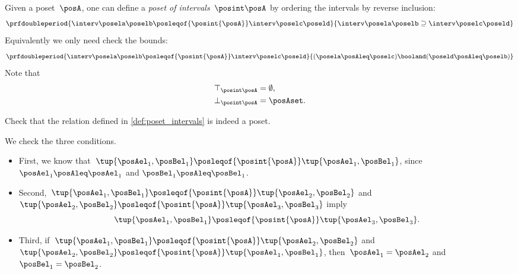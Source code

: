 \begin{definition}
    \label{def:poset_intervals}
    Given a poset~$\posA$, one can define a \emph{poset of intervals}~$\posint\posA$
    by ordering the intervals by reverse inclusion:
    \begin{equation}
        \prfdoubleperiod{
            \interv \posela \poselb
            \posleqof{\posint{\posA}}
            \interv \poselc \poseld
        }{
            \interv \posela \poselb
            \supseteq
            \interv \poselc \poseld
        }
    \end{equation}
    Equivalently we only need check the bounds:
    \begin{equation}
        \prfdoubleperiod{
            \interv \posela \poselb
            \posleqof{\posint{\posA}}
            \interv \poselc \poseld
        }{
            (\posela \posAleq \poselc ) \booland (\poseld \posAleq \poselb)
        }
    \end{equation}
    Note that
    \begin{align}
        \top_{\posint \posA} & = \emptyset, \\
        \bot_{\posint \posA} & = \posAset.
    \end{align}
\end{definition}
\begin{exercise}
    Check that the relation defined in \cref{def:poset_intervals} is indeed a poset.
\end{exercise}
\begin{solution}
    We check the three conditions.
    \begin{itemize}
        \item First, we know that~$\tup{\posAel_1,\posBel_1}\posleqof{\posint{\posA}}\tup{\posAel_1,\posBel_1}$, since $\posAel_1\posAleq \posAel_1$ and $\posBel_1\posAleq \posBel_1$.
        \item Second,~$\tup{\posAel_1,\posBel_1}\posleqof{\posint{\posA}}\tup{\posAel_2,\posBel_2}$ and $\tup{\posAel_2,\posBel_2}\posleqof{\posint{\posA}}\tup{\posAel_3,\posBel_3}$ imply
              \begin{equation}
                  \tup{\posAel_1,\posBel_1}\posleqof{\posint{\posA}}\tup{\posAel_3,\posBel_3}.
              \end{equation}
        \item Third, if~$\tup{\posAel_1,\posBel_1}\posleqof{\posint{\posA}}\tup{\posAel_2,\posBel_2}$ and $\tup{\posAel_2,\posBel_2}\posleqof{\posint{\posA}}\tup{\posAel_1,\posBel_1}$, then~$\posAel_1=\posAel_2$ and~$\posBel_1=\posBel_2$.
    \end{itemize}
\end{solution}
\vfill
\clearpage
